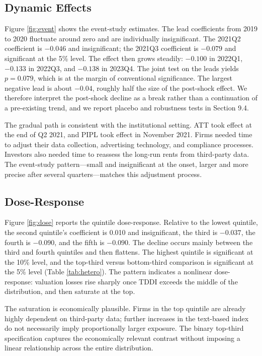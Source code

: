 \subsection{Dynamic Effects}

Figure \ref{fig:event} shows the event-study estimates. The lead coefficients from 2019 to 2020 fluctuate around zero and are individually insignificant. The 2021Q2 coefficient is $-0.046$ and insignificant; the 2021Q3 coefficient is $-0.079$ and significant at the 5\% level. The effect then grows steadily: $-0.100$ in 2022Q1, $-0.133$ in 2022Q3, and $-0.138$ in 2023Q4. The joint test on the leads yields $p=0.079$, which is at the margin of conventional significance. The largest negative lead is about $-0.04$, roughly half the size of the post-shock effect. We therefore interpret the post-shock decline as a break rather than a continuation of a pre-existing trend, and we report placebo and robustness tests in Section 9.4.

The gradual path is consistent with the institutional setting. ATT took effect at the end of Q2 2021, and PIPL took effect in November 2021. Firms needed time to adjust their data collection, advertising technology, and compliance processes. Investors also needed time to reassess the long-run rents from third-party data. The event-study pattern—small and insignificant at the onset, larger and more precise after several quarters—matches this adjustment process.

\subsection{Dose-Response}

Figure \ref{fig:dose} reports the quintile dose-response. Relative to the lowest quintile, the second quintile's coefficient is 0.010 and insignificant, the third is $-0.037$, the fourth is $-0.090$, and the fifth is $-0.090$. The decline occurs mainly between the third and fourth quintiles and then flattens. The highest quintile is significant at the 10\% level, and the top-third versus bottom-third comparison is significant at the 5\% level (Table \ref{tab:hetero}). The pattern indicates a nonlinear dose-response: valuation losses rise sharply once TDDI exceeds the middle of the distribution, and then saturate at the top.

The saturation is economically plausible. Firms in the top quintile are already highly dependent on third-party data; further increases in the text-based index do not necessarily imply proportionally larger exposure. The binary top-third specification captures the economically relevant contrast without imposing a linear relationship across the entire distribution.

